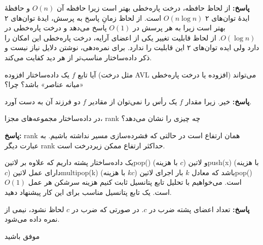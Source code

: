 \documentclass[12pt, a4paper]{article}
\newcommand{\vsp}{\vspace{34pt}}
\newcommand{\پاسخ}[2]{\color{answercolor}\textbf{پاسخ: }#2\color{black}\vspace{-0.3cm}}
\begin{document}
\پاسخ{\vsp\vsp}{
	از لحاظ حافظه، درخت پاره‌خطی بهتر است زیرا حافظه آن $O(n)$ و حافظۀ ایدۀ توان‌های ۲ $O(n\log n)$ است. از لحاظ زمانِ پاسخ به پرسش، ایدۀ توان‌های ۲ بهتر است زیرا به هر پرسش در $O(1)$ پاسخ می‌دهد و درخت پاره‌خطی در $O(\log n)$. از لحاظ قابلیت تغییر یکی از اعضای آرایه، درخت پاره‌خطی این امکان را دارد ولی ایده توان‌های ۲ این قابلیت را ندارد. برای نمره‌دهی، نوشتن دلایل نیاز نیست و ذکر داده‌ساختار مناسب‌تر از هر دید کفایت می‌کند.
	
}

آیا تابع $f$ یک داده‌ساختار افزوده (مثل درخت AVL افزوده یا درخت پاره‌خطی) می‌تواند «میانه عناصر» باشد؟ چرا؟

\پاسخ{\vsp\vsp}{
	خیر. زیرا مقدار $f$ یک رأس را نمی‌توان از مقادیر $f$ دو فرزند آن به دست آورد.
	
}

در داده‌ساختار مجموعه‌های مجزا، rank چه چیزی را نشان می‌دهد؟

\پاسخ{\vsp\vsp}{
	rank
	همان ارتفاع است در حالتی که فشرده‌سازی مسیر نداشته باشیم. به عبارت دیگر rank حداکثر ارتفاع ممکن زیردرخت است.
	
}

یک داده‌ساختار پشته داریم که علاوه بر ‌لاتین{pop()} (با هزینه $c$) و ‌لاتین{push(x)} (با هزینه $c$) دارای عمل ‌لاتین{multipop(k)} (با هزینه $kc$) باشد که معادل $k$ بار اجرای ‌لاتین{pop()} است. می‌خواهیم با تحلیل تابع پتانسیل ثابت کنیم هزینه سرشکن هر عمل $O(1)$ است. یک تابع پتانسیل مناسب برای این کار پیشنهاد دهید.

\پاسخ{\vsp\vsp}{
تعداد اعضای پشته ضرب در $c$. در صورتی که ضرب در $c$ لحاظ نشود، نیمی از نمره داده می‌شود.
	
}
\vspace{1pt}
\begin{flushleft}
موفق باشید
\end{flushleft}
\end{document}
